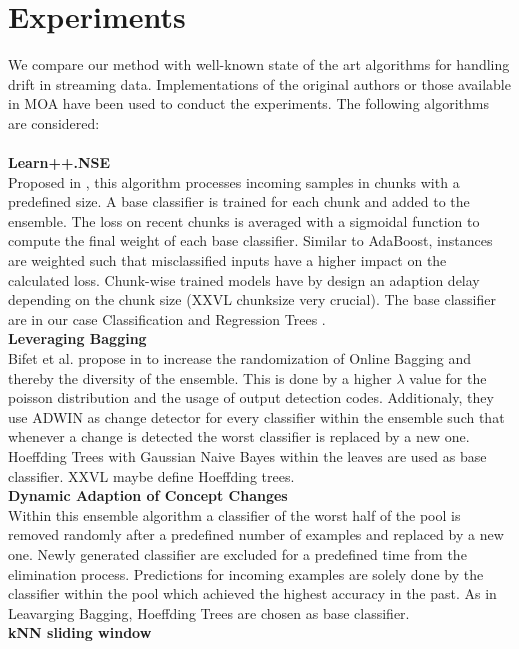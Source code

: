 \documentclass[conference]{IEEEtran}
\begin{document}
\section{Experiments}
We compare our method with well-known state of the art algorithms for handling drift in streaming data. Implementations of the original authors or those available in MOA \cite{bifet2010moa}
have been used to conduct the experiments. The following algorithms are considered:\\
\\\textbf{Learn++.NSE}\\
Proposed in \cite{5975223}, this algorithm processes incoming samples in chunks with a predefined size. A base classifier is trained for each chunk and added to the ensemble. The loss on recent chunks is averaged with a sigmoidal function
to compute the final weight of each base classifier. Similar to AdaBoost, instances are weighted such that misclassified inputs have a higher impact on the calculated loss.
Chunk-wise trained models have by design an adaption delay depending on the chunk size (XXVL chunksize very crucial). The base classifier are in our case Classification and Regression Trees \cite{cart84}.
\\\textbf{Leveraging Bagging}\\
Bifet et al. propose in \cite{bifet2010leveraging} to increase the randomization of Online Bagging \cite{oza2005online} and thereby the diversity of the ensemble.
This is done by a higher $\lambda$ value for the poisson distribution and the usage of output detection codes. Additionaly, they use ADWIN as change detector for every classifier within the ensemble such that whenever a change is detected 
the worst classifier is replaced by a new one. Hoeffding Trees\cite{domingos2000mining} with Gaussian Naive Bayes within the leaves are used as base classifier.
XXVL maybe define Hoeffding trees.
\\\textbf{Dynamic Adaption of Concept Changes}\\
Within this ensemble algorithm \cite{jaber2013online} a classifier of the worst half of the pool is removed randomly after a predefined number of examples and replaced by a new one. 
Newly generated classifier are excluded for a predefined time from the elimination process. Predictions for incoming examples are solely done by the classifier within the pool which
achieved the highest accuracy in the past. As in Leavarging Bagging, Hoeffding Trees are chosen as base classifier.
\\\textbf{kNN sliding window}\\
\end{document}
